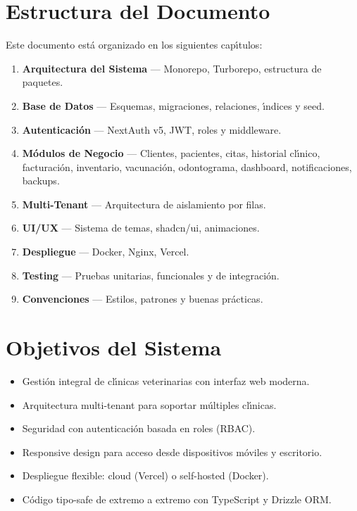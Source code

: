 \section{Estructura del Documento}

Este documento est\'a organizado en los siguientes cap\'{\i}tulos:

\begin{enumerate}[leftmargin=*]
    \item \textbf{Arquitectura del Sistema} --- Monorepo, Turborepo, estructura de paquetes.
    \item \textbf{Base de Datos} --- Esquemas, migraciones, relaciones, \'{\i}ndices y seed.
    \item \textbf{Autenticaci\'on} --- NextAuth v5, JWT, roles y middleware.
    \item \textbf{M\'odulos de Negocio} --- Clientes, pacientes, citas, historial cl\'{\i}nico,
          facturaci\'on, inventario, vacunaci\'on, odontograma, dashboard,
          notificaciones, backups.
    \item \textbf{Multi-Tenant} --- Arquitectura de aislamiento por filas.
    \item \textbf{UI/UX} --- Sistema de temas, shadcn/ui, animaciones.
    \item \textbf{Despliegue} --- Docker, Nginx, Vercel.
    \item \textbf{Testing} --- Pruebas unitarias, funcionales y de integraci\'on.
    \item \textbf{Convenciones} --- Estilos, patrones y buenas pr\'acticas.
\end{enumerate}

\section{Objetivos del Sistema}

\begin{itemize}[leftmargin=*]
    \item Gesti\'on integral de cl\'{\i}nicas veterinarias con interfaz web moderna.
    \item Arquitectura multi-tenant para soportar m\'ultiples cl\'{\i}nicas.
    \item Seguridad con autenticaci\'on basada en roles (RBAC).
    \item Responsive design para acceso desde dispositivos m\'oviles y escritorio.
    \item Despliegue flexible: cloud (Vercel) o self-hosted (Docker).
    \item C\'odigo tipo-safe de extremo a extremo con TypeScript y Drizzle ORM.
\end{itemize}

